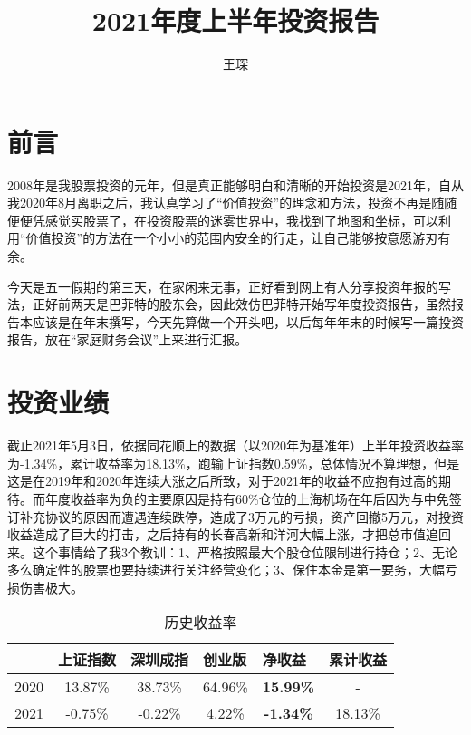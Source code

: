 \documentclass[UTF8,a4paper,12pt,lang=cn,fontset = windows]{elegantpaper} %
\title{2021年度上半年投资报告} %
\author{王琛}
\date{\zhtoday}
\begin{document}
\maketitle
\section{前言}

2008年是我股票投资的元年，但是真正能够明白和清晰的开始投资是2021年，自从我2020年8月离职之后，我认真学习了“价值投资”的理念和方法，投资不再是随随便便凭感觉买股票了，在投资股票的迷雾世界中，我找到了地图和坐标，可以利用“价值投资”的方法在一个小小的范围内安全的行走，让自己能够按意愿游刃有余。

今天是五一假期的第三天，在家闲来无事，正好看到网上有人分享投资年报的写法，正好前两天是巴菲特的股东会，因此效仿巴菲特开始写年度投资报告，虽然报告本应该是在年末撰写，今天先算做一个开头吧，以后每年年末的时候写一篇投资报告，放在“家庭财务会议”上来进行汇报。

\section{投资业绩}

截止2021年5月3日，依据同花顺上的数据（以2020年为基准年）上半年投资收益率为-1.34\%，累计收益率为18.13\%，跑输上证指数0.59\%，总体情况不算理想，但是这是在2019年和2020年连续大涨之后所致，对于2021年的收益不应抱有过高的期待。而年度收益率为负的主要原因是持有60\%仓位的上海机场在年后因为与中免签订补充协议的原因而遭遇连续跌停，造成了3万元的亏损，资产回撤5万元，对投资收益造成了巨大的打击，之后持有的长春高新和洋河大幅上涨，才把总市值追回来。这个事情给了我3个教训：1、严格按照最大个股仓位限制进行持仓；2、无论多么确定性的股票也要持续进行关注经营变化；3、保住本金是第一要务，大幅亏损伤害极大。

\begin{table}[htbp]
    \centering
	\caption{历史收益率}
\begin{tabular}{rccccc}
    \toprule
    \multicolumn{1}{l}{\textbf{}} & \multicolumn{1}{l}{\textbf{上证指数}} & \multicolumn{1}{l}{\textbf{深圳成指}} & \multicolumn{1}{l}{\textbf{创业版}} & \multicolumn{1}{l}{\textbf{净收益}} & \multicolumn{1}{l}{\textbf{累计收益}} \\
    \midrule
    2020                          & 13.87\%                           & 38.73\%                           & 64.96\%                          & \textbf{15.99\%}                 & -                                 \\
    2021                          & -0.75\%                           & -0.22\%                           & 4.22\%                           & \textbf{-1.34\%}                 & 18.13\%                          \\
    \bottomrule
    \end{tabular}
\end{table}
\end{document}
